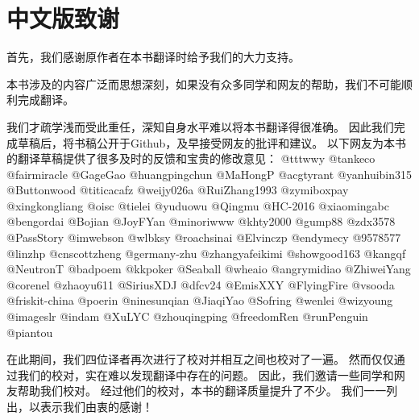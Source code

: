 \chapter*{中文版致谢}

首先，我们感谢原作者在本书翻译时给予我们的大力支持。

本书涉及的内容广泛而思想深刻，如果没有众多同学和网友的帮助，我们不可能顺利完成翻译。

我们才疏学浅而受此重任，深知自身水平难以将本书翻译得很准确。
因此我们完成草稿后，将书稿公开于Github，及早接受网友的批评和建议。
以下网友为本书的翻译草稿提供了很多及时的反馈和宝贵的修改意见：
@tttwwy @tankeco @fairmiracle @GageGao @huangpingchun @MaHongP @acgtyrant @yanhuibin315 @Buttonwood @titicacafz @weijy026a @RuiZhang1993 @zymiboxpay @xingkongliang 
@oisc @tielei @yuduowu @Qingmu @HC-2016 @xiaomingabc @bengordai @Bojian @JoyFYan @minoriwww @khty2000 @gump88 @zdx3578 @PassStory @imwebson @wlbksy @roachsinai 
@Elvinczp @endymecy @9578577 @linzhp @cnscottzheng @germany-zhu @zhangyafeikimi @showgood163 @kangqf @NeutronT @badpoem @kkpoker @Seaball @wheaio @angrymidiao
@ZhiweiYang @corenel @zhaoyu611 @SiriusXDJ @dfcv24 @EmisXXY @FlyingFire @vsooda @friskit-china @poerin @ninesunqian @JiaqiYao @Sofring @wenlei @wizyoung 
@imageslr @indam @XuLYC @zhouqingping @freedomRen @runPenguin @piantou

在此期间，我们四位译者再次进行了校对并相互之间也校对了一遍。
然而仅仅通过我们的校对，实在难以发现翻译中存在的问题。
因此，我们邀请一些同学和网友帮助我们校对。
经过他们的校对，本书的翻译质量提升了不少。
我们一一列出，以表示我们由衷的感谢！

